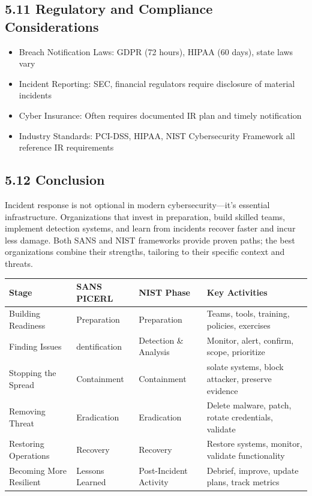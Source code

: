 \documentclass[10pt]{article}
\begin{document}
\subsection*{5.11 Regulatory and Compliance Considerations}
\begin{itemize}
  \item Breach Notification Laws: GDPR (72 hours), HIPAA (60 days), state laws vary
  \item Incident Reporting: SEC, financial regulators require disclosure of material incidents
  \item Cyber Insurance: Often requires documented IR plan and timely notification
  \item Industry Standards: PCI-DSS, HIPAA, NIST Cybersecurity Framework all reference IR requirements
\end{itemize}

\subsection*{5.12 Conclusion}
Incident response is not optional in modern cybersecurity—it's essential infrastructure. Organizations that invest in preparation, build skilled teams, implement detection systems, and learn from incidents recover faster and incur less damage. Both SANS and NIST frameworks provide proven paths; the best organizations combine their strengths, tailoring to their specific context and threats.

\begin{table}[h]
\begin{center}
\begin{tabular}{|l|l|l|l|}
\hline
Stage & SANS PICERL & NIST Phase & Key Activities \\
\hline
Building Readiness & Preparation & Preparation & Teams, tools, training, policies, exercises \\
\hline
Finding Issues & dentification & Detection \& Analysis & Monitor, alert, confirm, scope, prioritize \\
\hline
Stopping the Spread & Containment & Containment & solate systems, block attacker, preserve evidence \\
\hline
Removing Threat & Eradication & Eradication & Delete malware, patch, rotate credentials, validate \\
\hline
Restoring Operations & Recovery & Recovery & Restore systems, monitor, validate functionality \\
\hline
Becoming More Resilient & Lessons Learned & Post-Incident Activity & Debrief, improve, update plans, track metrics \\
\hline
\end{tabular}
\end{center}
\end{table}
\end{document}
